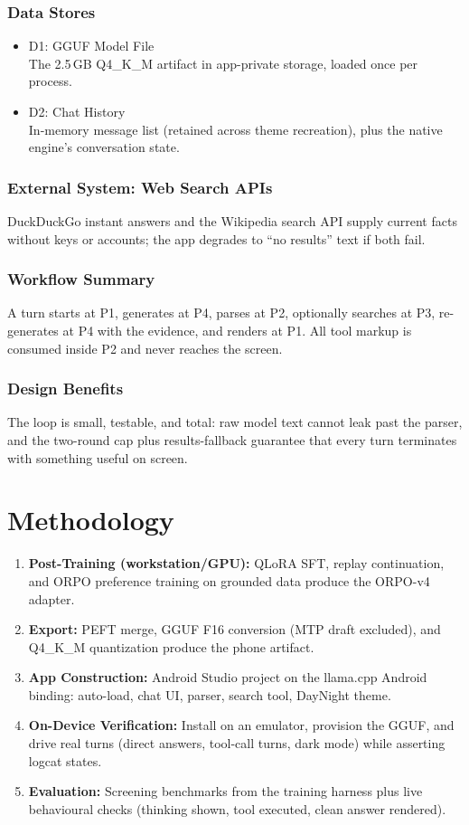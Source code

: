 \documentclass[12pt,a4paper]{report}
\begin{document}
\subsubsection{Data Stores}
\begin{itemize}
    \item D1: GGUF Model File
    \\The 2.5\,GB Q4\_K\_M artifact in app-private storage, loaded once per process.
    \item D2: Chat History
    \\In-memory message list (retained across theme recreation), plus the native engine's conversation state.
\end{itemize}

\subsubsection{External System: Web Search APIs}
DuckDuckGo instant answers and the Wikipedia search API supply current
facts without keys or accounts; the app degrades to ``no results''
text if both fail.
\subsubsection{Workflow Summary}
A turn starts at P1, generates at P4, parses at P2, optionally searches
at P3, re-generates at P4 with the evidence, and renders at P1. All
tool markup is consumed inside P2 and never reaches the screen.
\subsubsection{Design Benefits}
The loop is small, testable, and total: raw model text cannot leak past
the parser, and the two-round cap plus results-fallback guarantee that
every turn terminates with something useful on screen.
\section{Methodology}
\begin{enumerate}
    \item \textbf{Post-Training (workstation/GPU):}
    QLoRA SFT, replay continuation, and ORPO preference training on grounded data produce the ORPO-v4 adapter.
    \item \textbf{Export:}
    PEFT merge, GGUF F16 conversion (MTP draft excluded), and Q4\_K\_M quantization produce the phone artifact.
    \item \textbf{App Construction:}
    Android Studio project on the llama.cpp Android binding: auto-load, chat UI, parser, search tool, DayNight theme.
    \item \textbf{On-Device Verification:}
    Install on an emulator, provision the GGUF, and drive real turns (direct answers, tool-call turns, dark mode) while asserting logcat states.
    \item \textbf{Evaluation:}
    Screening benchmarks from the training harness plus live behavioural checks (thinking shown, tool executed, clean answer rendered).
\end{enumerate}
\end{document}

